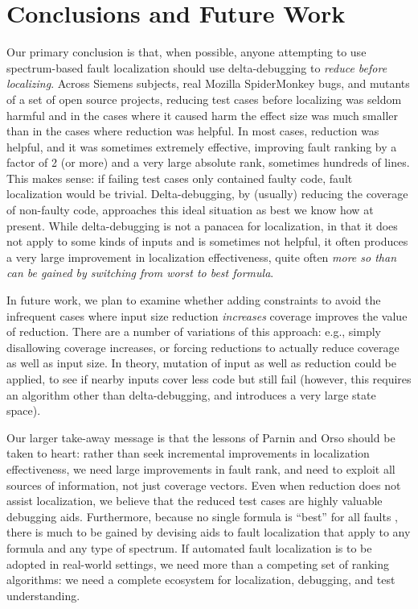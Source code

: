 \section{Conclusions and Future Work}

Our primary conclusion is that, when possible, anyone attempting to
use spectrum-based fault localization should use delta-debugging to
\emph{reduce before localizing}.  Across Siemens subjects, real
Mozilla SpiderMonkey bugs, and mutants of a set of open source
projects, reducing test cases before localizing was seldom harmful and
in the cases where it caused harm the effect size was much smaller
than in the cases where reduction was helpful.  In most cases,
reduction was helpful, and it was sometimes extremely effective,
improving fault ranking by a factor of 2 (or more) and a very large
absolute rank, sometimes hundreds of lines. This makes sense: if
failing test cases only contained faulty code, fault localization
would be trivial.  Delta-debugging, by (usually) reducing the coverage
of non-faulty code, approaches this ideal situation as best we know
how at present.  While delta-debugging is not a panacea for
localization, in that it does not apply to some kinds of inputs and is
sometimes not helpful, it often produces a very large improvement in
localization effectiveness, quite often \emph{more so than can be
gained by switching from worst to best formula}.

In future work, we plan to examine whether adding constraints to avoid
the infrequent cases where input size reduction \emph{increases}
coverage improves the value of reduction.  There are a number of
variations of this approach: e.g., simply disallowing coverage
increases, or forcing reductions to actually reduce coverage as well
as input size.  In theory, mutation of input as well as reduction
could be applied, to see if nearby inputs cover less code but still
fail (however, this requires an algorithm other than delta-debugging,
and introduces a very large state space).  

Our larger take-away message is that the lessons of Parnin and Orso
\cite{AutoHelp} should be taken to heart: rather than seek incremental
improvements in localization effectiveness, we need large improvements
in fault rank, and need to exploit all sources of information, not
just coverage vectors.  Even when reduction does not assist
localization, we believe that the reduced test cases are highly
valuable debugging aids.  Furthermore, because no single formula is
``best'' for all faults \cite{yoo2014no}, there is much to be gained
by devising aids to fault localization that apply to any formula and
any type of spectrum.  If automated fault localization is to be
adopted in real-world settings, we need more than a competing set of
ranking algorithms: we need a complete ecosystem for localization, debugging,
and test understanding.
